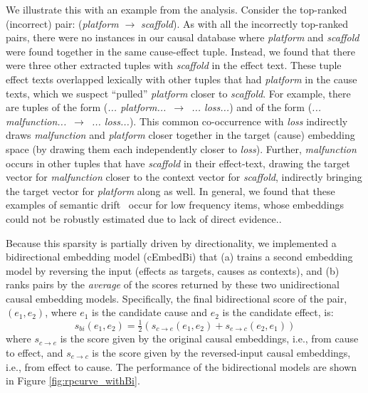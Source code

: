 We illustrate this with an example from the analysis.  Consider the top-ranked (incorrect) pair:  (\emph{platform} $\rightarrow$ \emph{scaffold}).  As with all the incorrectly top-ranked pairs, there were no instances in our causal database where \emph{platform} and \emph{scaffold} were found together in the same cause-effect tuple.  
%
Instead, we found that there were  three other extracted tuples with \emph{scaffold} in the effect text.  
These tuple effect texts overlapped lexically with other tuples that had \textit{platform} in the cause texts, which we suspect ``pulled'' \textit{platform} closer to \textit{scaffold}.
For example, there are tuples of the form (\textit{... platform...}~$\rightarrow$~\textit{... loss...}) and of the form (\textit{... malfunction...}~$\rightarrow$~\textit{... loss...}).    
This common co-occurrence with \textit{loss} indirectly draws \textit{malfunction} and \textit{platform} closer together in the target (cause) embedding space (by drawing them each independently closer to \textit{loss}). 
Further, \textit{malfunction} occurs in other tuples that have \textit{scaffold} in their effect-text, drawing the target vector for \textit{malfunction} closer to the context vector for \textit{scaffold}, indirectly bringing the target vector for \textit{platform} along as well.
In general, we found that these examples of semantic drift~\citep{curran2007minimising} occur for low frequency items, whose embeddings could not be robustly estimated due to lack of direct evidence.. 

Because this sparsity is partially driven by directionality, 
we implemented a bidirectional embedding model (cEmbedBi) that (a) trains a second embedding model by reversing the input (effects as targets, causes as contexts), and (b) ranks pairs by the \textit{average} of the scores returned by these two unidirectional causal embedding models. 
Specifically, the final bidirectional score of the pair, $(e_1, e_2)$, where $e_1$ is the candidate cause and $e_2$ is the candidate effect, is:
\begin{equation}
s_{bi}(e_1, e_2) = \tfrac{1}{2}(s_{c{\rightarrow}e}(e_1, e_2) + s_{e \rightarrow c}(e_2, e_1))
\end{equation}
where $s_{c \rightarrow e}$ is the score given by the original causal embeddings, i.e., from cause to effect, and $s_{e \rightarrow c}$ is the score given by the reversed-input causal embeddings, i.e., from effect to cause.  The performance of the bidirectional models are shown in Figure \ref{fig:rpcurve_withBi}.



